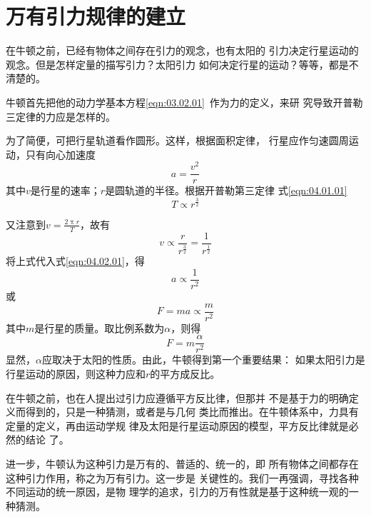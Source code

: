 \section{万有引力规律的建立}\label{sec:04.02}

在牛顿之前，已经有物体之间存在引力的观念，也有太阳的
引力决定行星运动的观念。但是怎样定量的描写引力？太阳引力
如何决定行星的运动？等等，都是不清楚的。

牛顿首先把他的动力学基本方程\eqref{eqn:03.02.01}~作为力的定义，来研
究导致开普勒三定律的力应是怎样的。

为了简便，可把行星轨道看作圆形。这样，根据面积定律，
行星应作匀速圆周运动，只有向心加速度
\begin{equation}\label{eqn:04.02.01}
	a = \frac { v ^ { 2 } } { r }  
\end{equation}
其中$ v $是行星的速率；$ r $是圆轨道的半径。根据开普勒第三定律
\lhbrak 式\eqref{eqn:04.01.01}\rhbrak 
\begin{equation*}
	T \propto r ^ { \frac { 3 } { 2 } }  
\end{equation*}

又注意到$ v = \frac { 2 \uppi r } { T }   $，故有
\begin{equation}\label{eqn:04.02.02}
	v \propto \frac { r } { r ^ \frac { 3 } {2}} = \frac { 1 } { r ^ {  \frac { 1 } { 2 } } }  
\end{equation}
将上式代入式\eqref{eqn:04.02.01}，得
\begin{equation}\label{eqn:04.02.03}
	a \propto \frac { 1 } { r ^ { 2 } }  
\end{equation}
或
\begin{equation*}
	F = m a \propto \frac { m } { r ^ { 2 } }  
\end{equation*}
其中$ m $是行星的质量。取比例系数为$ \alpha $，则得
\begin{equation}\label{eqn:04.02.04}
	F = m \frac { \alpha } { r ^ { 2 } } 
\end{equation}
显然，$ \alpha $应取决于太阳的性质。由此，牛顿得到第一个重要结果：
如果太阳引力是行星运动的原因，则这种力应和$ r $的平方成反比。

在牛顿之前，也在人提出过引力应遵循平方反比律，但那并
不是基于力的明确定义而得到的，只是一种猜测，或者是与几何
类比而推出。在牛顿体系中，力具有定量的定义，再由运动学规
律及太阳是行星运动原因的模型，平方反比律就是必然的结论
了。

进一步，牛顿认为这种引力是万有的、普适的、统一的，即
所有物体之间都存在这种引力作用，称之为万有引力。这一步是
关键性的。我们一再强调，寻找各种不同运动的统一原因，是物
理学的追求，引力的万有性就是基于这种统一观的一种猜测。

